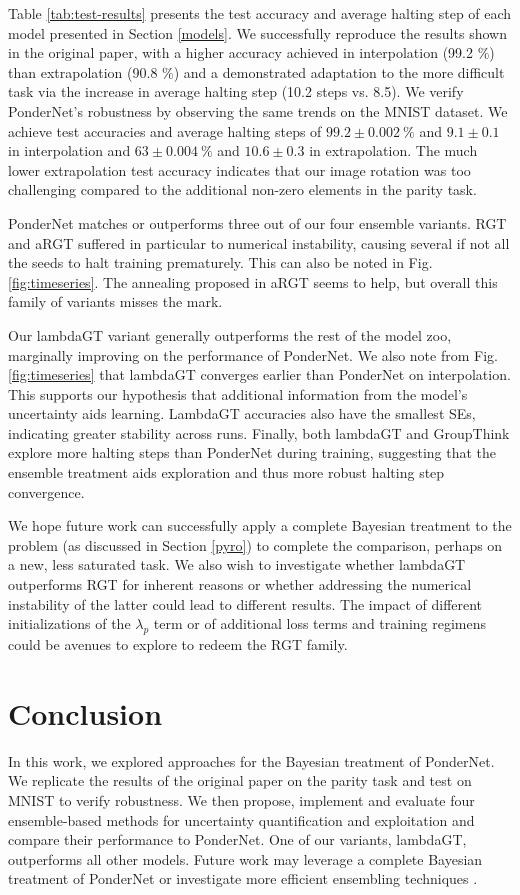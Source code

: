 \documentclass{article}
\begin{document}
Table \ref{tab:test-results} presents the test accuracy and average halting step of each model presented in Section \ref{models}. We successfully reproduce the results shown in the original paper, with a higher accuracy achieved in interpolation (99.2 \%) than extrapolation (90.8 \%) and a demonstrated adaptation to the more difficult task via the increase in average halting step (10.2 steps vs. 8.5). We verify PonderNet's robustness by observing the same trends on the MNIST dataset. We achieve test accuracies and average halting steps of $99.2\pm0.002~\%$ and $9.1\pm0.1$ in interpolation and $63 \pm 0.004~\%$ and $10.6\pm0.3$ in extrapolation. The much lower extrapolation test accuracy indicates that our image rotation was too challenging compared to the additional non-zero elements in the parity task.

PonderNet matches or outperforms three out of our four ensemble variants. RGT and aRGT suffered in particular to numerical instability, causing several if not all the seeds to halt training prematurely. This can also be noted in Fig. \ref{fig:timeseries}. The annealing proposed in aRGT seems to help, but overall this family of variants misses the mark.

Our lambdaGT variant generally outperforms the rest of the model zoo, marginally improving on the performance of PonderNet. We also note from Fig. \ref{fig:timeseries} that lambdaGT converges earlier than PonderNet on interpolation. This supports our hypothesis that additional information from the model's uncertainty aids learning. LambdaGT accuracies also have the smallest SEs, indicating greater stability across runs. Finally, both lambdaGT and GroupThink explore more halting steps than PonderNet during training, suggesting that the ensemble treatment aids exploration and thus more robust halting step convergence.

We hope future work can successfully apply a complete Bayesian treatment to the problem (as discussed in Section \ref{pyro}) to complete the comparison, perhaps on a new, less saturated task. We also wish to investigate whether lambdaGT outperforms RGT for inherent reasons or whether addressing the numerical instability of the latter could lead to different results. The impact of different initializations of the $\lambda_p$ term or of additional loss terms and training regimens could be avenues to explore to redeem the RGT family.

\section{Conclusion} \label{conclusion}
In this work, we explored approaches for the Bayesian treatment of PonderNet. We replicate the results of the original paper on the parity task and test on MNIST to verify robustness. We then propose, implement and evaluate four ensemble-based methods for uncertainty quantification and exploitation and compare their performance to PonderNet. One of our variants, lambdaGT, outperforms all other models. Future work may leverage a complete Bayesian treatment of PonderNet or investigate more efficient ensembling techniques \cite{garipov_loss_2018}.
\end{document}
